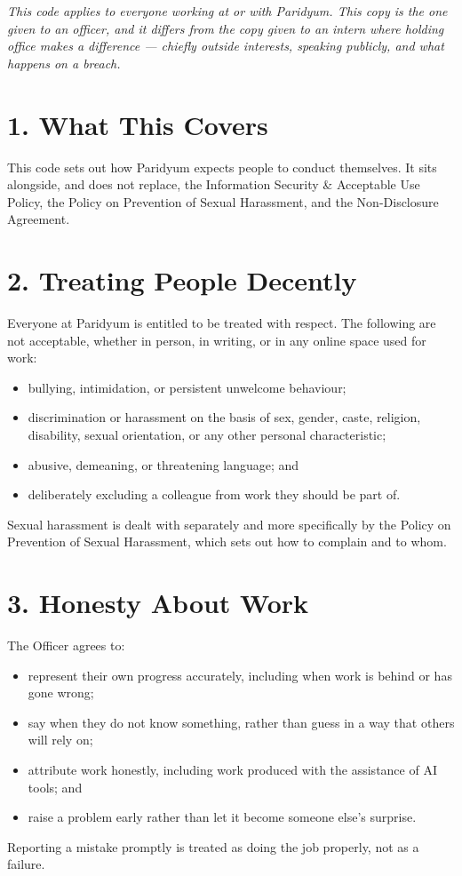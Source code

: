 \documentclass{paridyum}
\begin{document}
\paridyumletterhead
\paridyumdateref{\dkDocDate}{\dkDocRef}

\textit{This code applies to everyone working at or with Paridyum. This copy is the one
given to an officer, and it differs from the copy given to an intern where holding office
makes a difference --- chiefly outside interests, speaking publicly, and what happens on a
breach.}

\section*{1. What This Covers}
This code sets out how Paridyum expects people to conduct themselves. It sits
alongside, and does not replace, the Information Security \& Acceptable Use
Policy, the Policy on Prevention of Sexual Harassment, and the Non-Disclosure
Agreement.

\section*{2. Treating People Decently}
Everyone at Paridyum is entitled to be treated with respect. The following are
not acceptable, whether in person, in writing, or in any online space used for
work:
\begin{itemize}[leftmargin=*, noitemsep]
    \item bullying, intimidation, or persistent unwelcome behaviour;
    \item discrimination or harassment on the basis of sex, gender, caste,
          religion, disability, sexual orientation, or any other personal
          characteristic;
    \item abusive, demeaning, or threatening language; and
    \item deliberately excluding a colleague from work they should be part of.
\end{itemize}
Sexual harassment is dealt with separately and more specifically by the Policy
on Prevention of Sexual Harassment, which sets out how to complain and to whom.

\section*{3. Honesty About Work}
The Officer agrees to:
\begin{itemize}[leftmargin=*, noitemsep]
    \item represent their own progress accurately, including when work is
          behind or has gone wrong;
    \item say when they do not know something, rather than guess in a way
          that others will rely on;
    \item attribute work honestly, including work produced with the
          assistance of AI tools; and
    \item raise a problem early rather than let it become someone else's
          surprise.
\end{itemize}
Reporting a mistake promptly is treated as doing the job properly, not as a
failure.
\end{document}
